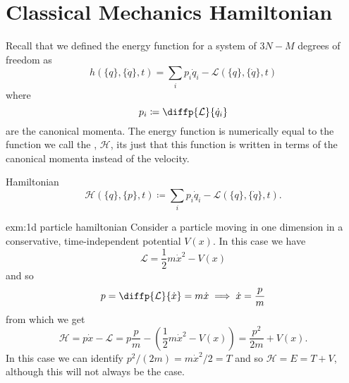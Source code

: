 \documentclass[fleqn]{NotesClass}
\newcommand*{\lagrangian}{\mathcal{L}}
\newcommand*{\hamiltonian}{\mathcal{H}}
\begin{document}
    \section{Classical Mechanics Hamiltonian}
    Recall that we defined the energy function for a system of \(3N - M\) degrees of freedom as
    \begin{equation}
        h(\{q\}, \{\dot{q}\}, t) = \sum_i p_i \dot{q}_i - \lagrangian(\{q\}, \{\dot{q}\}, t)
    \end{equation}
    where
    \begin{equation}
        p_i \coloneqq \diffp{\lagrangian}{\dot{q}_i}
    \end{equation}
    are the canonical momenta.
    The energy function is numerically equal to the function we call the , \(\hamiltonian\), its just that this function is written in terms of the canonical momenta instead of the velocity.
    \begin{dfn}{Hamiltonian}{}
        \begin{equation}\label{eqn:hamiltonian definition}
            \hamiltonian(\{q\}, \{p\}, t) \coloneqq \sum_{i} p_i \dot{q}_i - \lagrangian(\{q\}, \{\dot{q}\}, t).
        \end{equation}
    \end{dfn}    
    \begin{exm}{}{exm:1d particle hamiltonian}
        Consider a particle moving in one dimension in a conservative, time-independent potential \(V(x)\).
        In this case we have
        \begin{equation}
            \lagrangian = \frac{1}{2}m\dot{x}^2 - V(x)
        \end{equation}
        and so
        \begin{equation}
            p = \diffp{\lagrangian}{\dot{x}} = m\dot{x} \implies \dot{x} = \frac{p}{m}
        \end{equation}
        from which we get
        \begin{equation}
            \hamiltonian = p\dot{x} - \lagrangian = p\frac{p}{m} - \left( \frac{1}{2}m\dot{x}^2 - V(x) \right) = \frac{p^2}{2m} + V(x).
        \end{equation}
        In this case we can identify \(p^2/(2m) = m\dot{x}^2/2 = T\) and so \(\hamiltonian = E = T + V\), although this will not always be the case.
    \end{exm}
    
\end{document}
